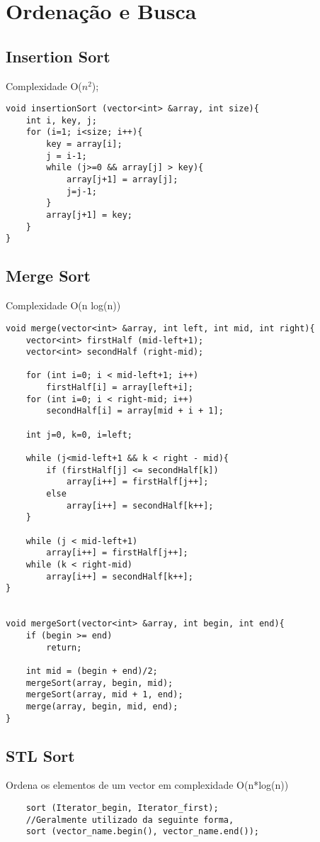 \section{Ordenação e Busca}

\subsection{Insertion Sort}
Complexidade O($n^2$);
\begin{verbatim}
void insertionSort (vector<int> &array, int size){
    int i, key, j;
    for (i=1; i<size; i++){
        key = array[i];
        j = i-1;
        while (j>=0 && array[j] > key){
            array[j+1] = array[j];
            j=j-1;
        }
        array[j+1] = key;
    }
}
\end{verbatim}

\subsection{Merge Sort}
Complexidade O(n log(n))
\begin{verbatim}
void merge(vector<int> &array, int left, int mid, int right){
    vector<int> firstHalf (mid-left+1);
    vector<int> secondHalf (right-mid);
 
    for (int i=0; i < mid-left+1; i++)  
        firstHalf[i] = array[left+i];
    for (int i=0; i < right-mid; i++)
        secondHalf[i] = array[mid + i + 1];

    int j=0, k=0, i=left; 

    while (j<mid-left+1 && k < right - mid){
        if (firstHalf[j] <= secondHalf[k])
            array[i++] = firstHalf[j++];
        else
            array[i++] = secondHalf[k++];
    }

    while (j < mid-left+1)
        array[i++] = firstHalf[j++];
    while (k < right-mid)
        array[i++] = secondHalf[k++];
}
 

void mergeSort(vector<int> &array, int begin, int end){
    if (begin >= end)
        return;
 
    int mid = (begin + end)/2;
    mergeSort(array, begin, mid);
    mergeSort(array, mid + 1, end);
    merge(array, begin, mid, end);
}
\end{verbatim}

\subsection{STL Sort}
    Ordena os elementos de um vector em complexidade O(n*log(n))
\begin{verbatim}
    sort (Iterator_begin, Iterator_first);
    //Geralmente utilizado da seguinte forma,
    sort (vector_name.begin(), vector_name.end());
\end{verbatim}

